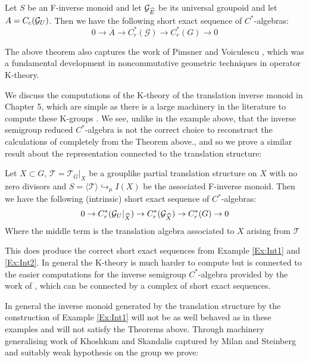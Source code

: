 \begin{thm}\label{Ex:Int3}
Let $S$ be an F-inverse monoid and let $\mathcal{G}_{\widehat{E}}$ be its universal groupoid and let $A=C_{c}(\mathcal{G}_{U})$. Then we have the following  short exact sequence of $C^{*}$-algebras:
\begin{equation*}
0 \rightarrow \overline{A} \rightarrow C^{*}_{r}(\mathcal{G}) \rightarrow C^{*}_{r}(G) \rightarrow 0
\end{equation*}
\end{thm}

The above theorem also captures the work of Pimsner and Voiculescu \cite{MR670181}, which was a fundamental development in noncommutative geometric techniques in operator K-theory.

We discuss the computations of the K-theory of the translation inverse monoid in Chapter 5, which are simple as there is a large machinery in the literature to compute these K-groups \cite{Nor-2012,CEL-2}. We see, unlike in the example above, that the inverse semigroup reduced $C^{*}$-algebra is not the correct choice to reconstruct the calculations of \cite{MR670181} completely from the Theorem above., and so we prove a similar result about the representation connected to the translation structure:

\begin{thm}
Let $X \subset G$, $\mathcal{T}=\mathcal{T}_{G}|_{X}$ be a grouplike partial translation structure on $X$ with no zero divisors and $S=\langle \mathcal{T} \rangle \hookrightarrow_{\mu} I(X)$ be the associated F-inverse monoid. Then we have the following (intrinsic) short exact sequence of $C^{*}$-algebras:
\begin{equation}\label{eqn1}
0 \rightarrow C^{*}_{r}(\mathcal{G}_{U}|_{\widehat{X}}) \rightarrow C^{*}_{r}(\mathcal{G}_{\widehat{X}}) \rightarrow C^{*}_{r}(G) \rightarrow 0
\end{equation}
Where the middle term is the translation algebra associated to $X$ arising from $\mathcal{T}$
\end{thm}

This does produce the correct short exact sequences from Example \ref{Ex:Int1} and \ref{Ex:Int2}. In general the K-theory is much harder to compute but is connected to the easier computations for the inverse semigroup $C^{*}$-algebra provided by the work of \cite{Nor-2012,CEL-2}, which can be connected by a complex of short exact sequences.

In general the inverse monoid generated by the translation structure by the construction of Example \ref{Ex:Int1} will not be as well behaved as in these examples and will not satisfy the Theorems above.
Through machinery generalising work of Khoshkam and Skandalis \cite{MR1900993} captured by Milan and Steinberg \cite{Milan-Steinberg} and suitably weak hypothesis on the group we prove:

